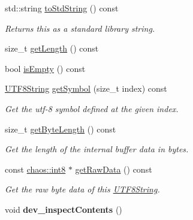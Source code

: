 \begin{DoxyCompactItemize}
std\-::string \hyperlink{classchaos_1_1str_1_1_u_t_f8_string_a4febd35eab6e30bbcf2bdf38097a2fd6}{to\-Std\-String} () const 
\begin{DoxyCompactList}\small\item\em Returns this as a standard library string. \end{DoxyCompactList}\item 
size\-\_\-t \hyperlink{classchaos_1_1str_1_1_u_t_f8_string_a16c5dc861a7a62d1595af424b3b4f58e}{get\-Length} () const 
\item 
bool \hyperlink{classchaos_1_1str_1_1_u_t_f8_string_a6011a783e7fdc46a39996729651ccd76}{is\-Empty} () const 
\item 
\hyperlink{classchaos_1_1str_1_1_u_t_f8_string}{U\-T\-F8\-String} \hyperlink{classchaos_1_1str_1_1_u_t_f8_string_afb0f987b7ac632ec223b118d58fe1bca}{get\-Symbol} (size\-\_\-t index) const 
\begin{DoxyCompactList}\small\item\em Get the utf-\/8 symbol defined at the given index. \end{DoxyCompactList}\item 
size\-\_\-t \hyperlink{classchaos_1_1str_1_1_u_t_f8_string_a848f2364bfff00544463f9f08748cdc2}{get\-Byte\-Length} () const 
\begin{DoxyCompactList}\small\item\em Get the length of the internal buffer data in bytes. \end{DoxyCompactList}\item 
const \hyperlink{namespacechaos_a56015674cfe4ad1fc583c3da6c724d8a}{chaos\-::int8} $\ast$ \hyperlink{classchaos_1_1str_1_1_u_t_f8_string_aa994b507f25989757e41a65fe02e6f35}{get\-Raw\-Data} () const 
\begin{DoxyCompactList}\small\item\em Get the raw byte data of this \hyperlink{classchaos_1_1str_1_1_u_t_f8_string}{U\-T\-F8\-String}. \end{DoxyCompactList}\item 
\hypertarget{classchaos_1_1str_1_1_u_t_f8_string_a5c2746c3e90b6712e4977130266c79d1}{void {\bfseries dev\-\_\-inspect\-Contents} ()}\label{classchaos_1_1str_1_1_u_t_f8_string_a5c2746c3e90b6712e4977130266c79d1}

\end{DoxyCompactItemize}
